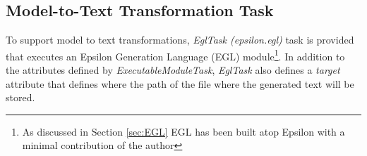 \subsection{Model-to-Text Transformation Task}
\label{sec:EglTask}
To support model to text transformations, \textit{EglTask (epsilon.egl)} task is provided that executes an Epsilon Generation Language (EGL) module\footnote{As discussed in Section \ref{sec:EGL} EGL has been built atop Epsilon with a minimal contribution of the author}. In addition to the attributes defined by \textit{ExecutableModuleTask}, \textit{EglTask} also defines a \textit{target} attribute that defines where the path of the file where the generated text will be stored.